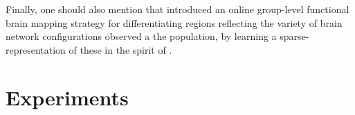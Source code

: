 Finally, one should also mention  \cite{varoquaux2013cohort} that introduced an online group-level functional brain mapping strategy for differentiating regions reflecting the variety of brain network configurations observed a
the population, by learning a sparse-representation of these in the spirit of  \cite{mairal2010}.


%

\section{Experiments}
\label{sec:exp}
